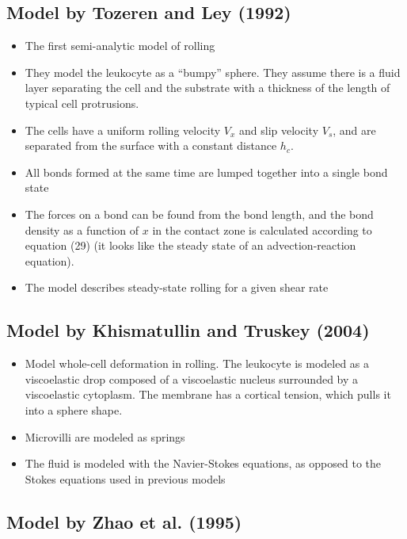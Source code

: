 \documentclass[
10pt, %
letterpaper, %
twocolumn, %
landscape %
]{article}
\begin{document}
\subsection{Model by Tozeren and Ley (1992)}
\label{sec:model-tozeren-ley}

\begin{itemize}
\item The first semi-analytic model of rolling
\item They model the leukocyte as a ``bumpy'' sphere. They assume
  there is a fluid layer separating the cell and the substrate with a
  thickness of the length of typical cell protrusions. 
\item The cells have a uniform rolling velocity $V_x$ and slip
  velocity $V_s$, and are separated from the surface with a constant
  distance $h_c$.
\item All bonds formed at the same time are lumped together into a
  single bond state
\item The forces on a bond can be found from the bond length, and the
  bond density as a function of $x$ in the contact zone is calculated
  according to equation (29) (it looks like the steady state of an
  advection-reaction equation).
\item The model describes steady-state rolling for a given shear rate
\end{itemize}

\subsection{Model by Khismatullin and Truskey (2004)}
\label{sec:model-khism-trusk}

\begin{itemize}
\item Model whole-cell deformation in rolling. The leukocyte is
  modeled as a viscoelastic drop composed of a viscoelastic nucleus
  surrounded by a viscoelastic cytoplasm. The membrane has a cortical
  tension, which pulls it into a sphere shape.
\item Microvilli are modeled as springs
\item The fluid is modeled with the Navier-Stokes equations, as
  opposed to the Stokes equations used in previous models
\end{itemize}

\subsection{Model by Zhao et al. (1995)}
\label{sec:model-zhao}
\end{document}
